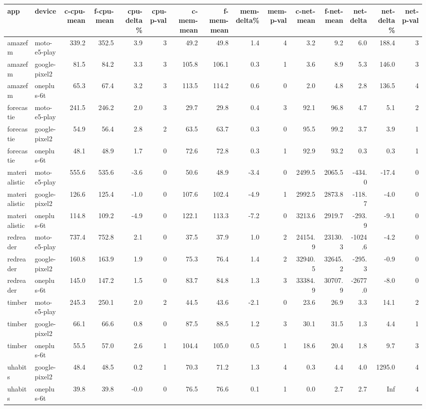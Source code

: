 \begin{table}[ht]
\centering
\begin{tabular}{llrrrrrrrrrrrrr}
  \hline
app & device & c-cpu-mean & f-cpu-mean & cpu-delta\% & cpu-p-val & c-mem-mean & f-mem-mean & mem-delta\% & mem-p-val & c-net-mean & f-net-mean & net-delta & net-delta\% & net-p-val \\ 
  \hline
amazefm & moto-e5-play & 339.2 & 352.5 & 3.9 & 3 & 49.2 & 49.8 & 1.4 & 4 & 3.2 & 9.2 & 6.0 & 188.4 & 3 \\ 
  amazefm & google-pixel2 & 81.5 & 84.2 & 3.3 & 3 & 105.8 & 106.1 & 0.3 & 1 & 3.6 & 8.9 & 5.3 & 146.0 & 3 \\ 
  amazefm & oneplus-6t & 65.3 & 67.4 & 3.2 & 3 & 113.5 & 114.2 & 0.6 & 0 & 2.0 & 4.8 & 2.8 & 136.5 & 4 \\ 
  forecastie & moto-e5-play & 241.5 & 246.2 & 2.0 & 3 & 29.7 & 29.8 & 0.4 & 3 & 92.1 & 96.8 & 4.7 & 5.1 & 2 \\ 
  forecastie & google-pixel2 & 54.9 & 56.4 & 2.8 & 2 & 63.5 & 63.7 & 0.3 & 0 & 95.5 & 99.2 & 3.7 & 3.9 & 1 \\ 
  forecastie & oneplus-6t & 48.1 & 48.9 & 1.7 & 0 & 72.6 & 72.8 & 0.3 & 1 & 92.9 & 93.2 & 0.3 & 0.3 & 1 \\ 
  materialistic & moto-e5-play & 555.6 & 535.6 & -3.6 & 0 & 50.6 & 48.9 & -3.4 & 0 & 2499.5 & 2065.5 & -434.0 & -17.4 & 0 \\ 
  materialistic & google-pixel2 & 126.6 & 125.4 & -1.0 & 0 & 107.6 & 102.4 & -4.9 & 1 & 2992.5 & 2873.8 & -118.7 & -4.0 & 0 \\ 
  materialistic & oneplus-6t & 114.8 & 109.2 & -4.9 & 0 & 122.1 & 113.3 & -7.2 & 0 & 3213.6 & 2919.7 & -293.9 & -9.1 & 0 \\ 
  redreader & moto-e5-play & 737.4 & 752.8 & 2.1 & 0 & 37.5 & 37.9 & 1.0 & 2 & 24154.9 & 23130.3 & -1024.6 & -4.2 & 0 \\ 
  redreader & google-pixel2 & 160.8 & 163.9 & 1.9 & 0 & 75.3 & 76.4 & 1.4 & 2 & 32940.5 & 32645.2 & -295.3 & -0.9 & 0 \\ 
  redreader & oneplus-6t & 145.0 & 147.2 & 1.5 & 0 & 83.7 & 84.8 & 1.3 & 3 & 33384.9 & 30707.9 & -2677.0 & -8.0 & 0 \\ 
  timber & moto-e5-play & 245.3 & 250.1 & 2.0 & 2 & 44.5 & 43.6 & -2.1 & 0 & 23.6 & 26.9 & 3.3 & 14.1 & 2 \\ 
  timber & google-pixel2 & 66.1 & 66.6 & 0.8 & 0 & 87.5 & 88.5 & 1.2 & 3 & 30.1 & 31.5 & 1.3 & 4.4 & 1 \\ 
  timber & oneplus-6t & 55.5 & 57.0 & 2.6 & 1 & 104.4 & 105.0 & 0.5 & 1 & 18.6 & 20.4 & 1.8 & 9.7 & 3 \\ 
  uhabits & google-pixel2 & 48.4 & 48.5 & 0.2 & 1 & 70.3 & 71.2 & 1.3 & 4 & 0.3 & 4.4 & 4.0 & 1295.0 & 4 \\ 
  uhabits & oneplus-6t & 39.8 & 39.8 & -0.0 & 0 & 76.5 & 76.6 & 0.1 & 1 & 0.0 & 2.7 & 2.7 & Inf & 4 \\ 
   \hline
\end{tabular}
\label{tab:direbase-experiment-result}
\end{table}
